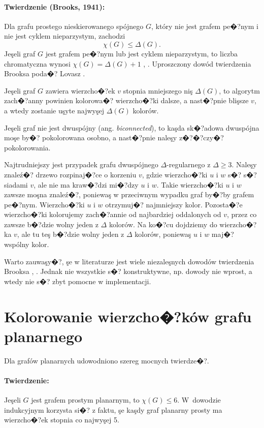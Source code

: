 \documentclass[12pt,a4paper]{mwrep}
\begin{document}
\paragraph{Twierdzenie (Brooks, 1941):} Dla grafu prostego nieskierowanego 
spójnego $G$, który nie jest grafem pe�?nym i nie jest cyklem nieparzystym, 
zachodzi
\begin{equation}
\chi(G) \le \Delta(G).
\end{equation}
Jeşeli graf $G$ jest grafem pe�?nym lub jest cyklem nieparzystym,
to liczba chromatyczna wynosi $\chi(G) = \Delta(G) + 1$
\cite{1941_Brooks},
\cite{wiki_Brooks}. 
Uproszczony dowód twierdzenia Brooksa poda�? Lovasz
\cite{1975_Lovasz}.

Jeşeli graf $G$ zawiera wierzcho�?ek $v$ stopnia mniejszego niş $\Delta(G)$,
to algorytm zach�?anny powinien kolorowa�? wierzcho�?ki dalsze, a nast�?pnie
blişsze $v$, a wtedy zostanie uşyte najwyşej $\Delta(G)$ kolorów.

Jeşeli graf nie jest dwuspójny (ang. \emph{biconnected}),
to kaşda sk�?adowa dwuspójna moşe by�? pokolorowana osobno,
a nast�?pnie naleşy z�?�?czy�? pokolorowania.

Najtrudniejszy jest przypadek grafu dwuspójnego $\Delta$-regularnego
z $\Delta \ge 3$. Naleşy znaleź�? drzewo rozpinaj�?ce o korzeniu $v$,
gdzie wierzcho�?ki $u$ i $w$ s�? s�?siadami $v$, ale nie ma kraw�?dzi
mi�?dzy $u$ i $w$. Takie wierzcho�?ki $u$ i $w$ zawsze moşna znaleź�?,
poniewaş w przeciwnym wypadku graf by�?by grafem pe�?nym.
Wierzcho�?ki $u$ i $w$ otrzymuj�? najmniejszy kolor.
Pozosta�?e wierzcho�?ki kolorujemy zach�?annie od najbardziej oddalonych
od $v$, przez co zawsze b�?dzie wolny jeden z $\Delta$ kolorów.
Na ko�?cu dojdziemy do wierzcho�?ka $v$, ale tu teş b�?dzie wolny
jeden z $\Delta$ kolorów, poniewaş $u$ i $w$ maj�? wspólny kolor.

Warto zauwaşy�?, şe w literaturze jest wiele niezaleşnych dowodów
twierdzenia Brooksa
\cite{1969_Melnikov_Vizing},
\cite{2014_Cranston_Rabern}.
Jednak nie wszystkie s�? konstruktywne, np. dowody nie wprost,
a wtedy nie s�? zbyt pomocne w implementacji.


\section{Kolorowanie wierzcho�?ków grafu planarnego}
\label{sec:kolorowanie_wierzcholkow_planarny}

Dla grafów planarnych udowodniono szereg mocnych twierdze�?.

\paragraph{Twierdzenie:} Jeşeli $G$ jest
grafem prostym planarnym, to $\chi(G) \le 6$.
W~dowodzie indukcyjnym korzysta si�? z faktu, şe kaşdy graf planarny 
prosty ma wierzcho�?ek stopnia co najwyşej 5.
\end{document}

